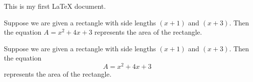 \documentclass[11pt]{article}
\begin{document}
This is my first LaTeX document.

Suppose we are given a rectangle with side lengths $(x+1)$ and $(x+3)$. Then the equation $A=x^2+4x+3$ represents the area of the rectangle.

Suppose we are given a rectangle with side lengths $(x+1)$ and $(x+3)$. Then the equation $$A=x^2+4x+3$$ represents the area of the rectangle.
\end{document}
